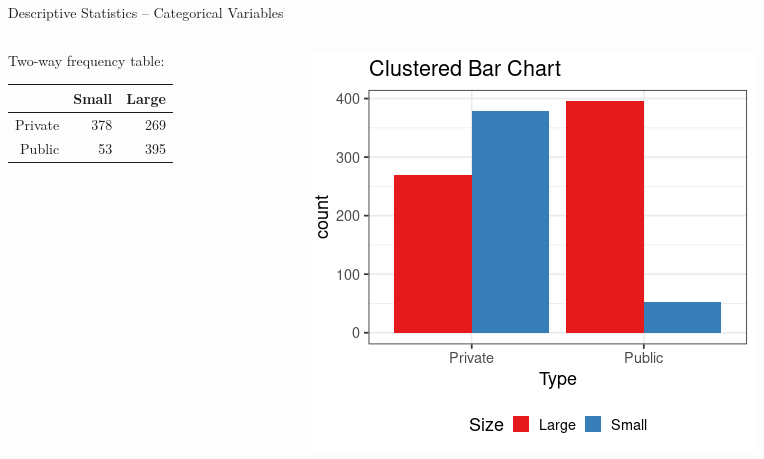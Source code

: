 \documentclass{beamer}
\begin{document}
\begin{frame}{Descriptive Statistics -- Categorical Variables}


\begin{columns}

  \begin{column}{0.45\textwidth}
  
  Two-way frequency table:
  
\begin{table}[ht]
\centering
\begin{tabular}{rrr}
  \hline
 & Small & Large \\ 
  \hline
Private & 378 & 269 \\ 
  Public &  53 & 395 \\ 
   \hline
\end{tabular}
\end{table}
  \end{column}
  \begin{column}{0.45\textwidth}
\begin{center}
\includegraphics[scale=0.35]{bivariate_cluster.png}
\end{center}
  \end{column}

\end{columns}

\end{frame}
\end{document}
